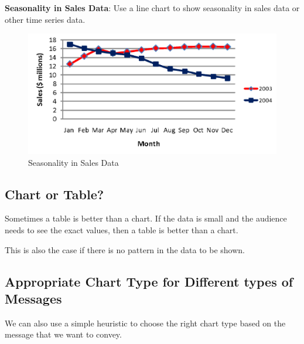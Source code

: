 \documentclass[11pt,fleqn]{book} %
\begin{document}
\begin{example}
\begin{example}
  \textbf{Seasonality in Sales Data}: Use a line chart to show
  seasonality in sales data or other time series data.

  \begin{figure}[hitb!]
    \centering
    \includegraphics[width=0.8\linewidth]{Pictures/seasonality.png}
    \caption{Seasonality in Sales Data}
    \label{fig:seasonality}
  \end{figure}
\end{example}

\subsection{Chart or Table?}

Sometimes a table is better than a chart.
If the data is small and the audience needs to see the exact values,
then a table is better than a chart.

This is also the case if there is no pattern in the data to be shown.

\subsection{Appropriate Chart Type for Different types of Messages}

We can also use a simple heuristic to choose the right chart type
based on the message that we want to convey.


\end{example}
\end{document}

